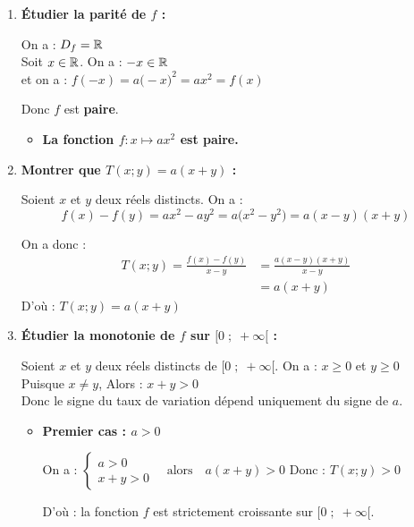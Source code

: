 \documentclass[10pt, a4paper]{article}
\begin{document}
\begin{Solution}[ACTIVITÉ][4]
\begin{enumerate}[leftmargin=*,itemsep=0.5pt]
\item \textbf{Étudier la parité de $f$ :}

On a : \quad $D_f = \mathbb{R}$ \\
Soit $x \in \mathbb{R}$. On a :  $-x \in \mathbb{R}$ \\
et on a :
    $f(-x) = a\big(-x\big)^2 
    = ax^2 
    = f(x)$
    
Donc $f$ est \textbf{paire}.

\begin{itemize}[label=$\blacktriangleright$, leftmargin=*, nosep]
\item \textbf{La fonction $f : x \mapsto ax^2$ est \textcolor{PrimaryColor}{paire}.}
\end{itemize}

\item \textbf{Montrer que $T(x;y) = a(x+y)$ :}

Soient $x$ et $y$ deux réels distincts. On a :
    $$f(x) - f(y) = ax^2 - ay^2 
    = a\big(x^2 - y^2\big) 
    = a(x-y)(x+y)$$

On a donc :
\begin{align*}
    T(x;y) = \frac{f(x) - f(y)}{x - y} 
    &= \frac{a(x-y)(x+y)}{x - y} \\
    &= a(x+y)
\end{align*}
D'où : \quad $T(x;y) = a(x+y)$ 

\item \textbf{Étudier la monotonie de $f$ sur $\big[0 \;;\; +\infty\big[$ :}

Soient $x$ et $y$ deux réels distincts de $\big[0 \;;\; +\infty\big[$.
On a : $x \geq 0$ et $y \geq 0$ \\
Puisque $x \neq y$, Alors : $x+y > 0$ \\
Donc le signe du taux de variation dépend uniquement du signe de $a$.
\begin{itemize}[leftmargin=*,itemsep=0.5pt]
    \item \textbf{Premier cas : $a > 0$}
    
    On a :
     $\begin{cases} 
        a > 0 \\ 
        x + y > 0 
    \end{cases} \quad \text{alors} \quad a(x+y) > 0$ 
    Donc : \quad $T(x;y) > 0$

    D'où : la fonction $f$ est strictement croissante sur $\big[0 \;;\; +\infty\big[$.


\end{itemize}
\end{enumerate}
\end{Solution}
\end{document}

